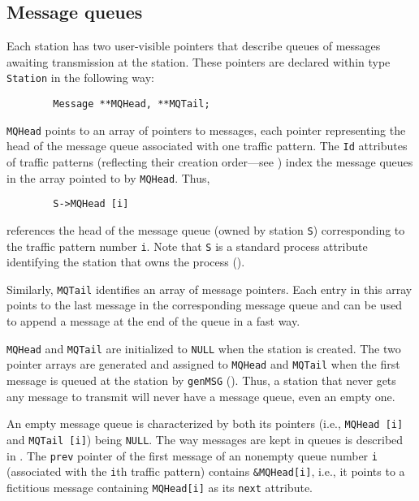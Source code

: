 \subsection{Message queues}
\label{rm_cl_mq}

Each station has two user-visible
pointers that describe queues of messages awaiting
transmission at the station.
These pointers are declared within type {\tt Station} in the following way:
\begin{verbatim}
        Message **MQHead, **MQTail;
\end{verbatim}

\noindent
{\tt MQHead} points to an array of pointers to messages, each pointer
representing the head of the message queue associated with one
traffic pattern.
The {\tt Id} attributes of traffic patterns (reflecting their creation
order---see ) index the message queues in the array
pointed to by {\tt MQHead}.
Thus,
\begin{verbatim}
        S->MQHead [i]
\end{verbatim}
references the head of the message queue (owned by station {\tt S})
corresponding to the traffic pattern number {\tt i}.
Note that {\tt S} is a standard process attribute identifying the station
that owns the process ().

Similarly, {\tt MQTail} identifies an array of message pointers.
Each entry
in this array points to the last message in the corresponding message queue
and can be used to append a message at the end of the queue in a fast way.

{\tt MQHead} and {\tt MQTail} are initialized to {\tt NULL} when the station
is created.
The two pointer arrays are generated and assigned to {\tt MQHead} and
{\tt MQTail} when
the first message is queued at the station by {\tt genMSG}
().
Thus, a station that never gets any message to transmit will never
have a message queue, even an empty one.

An empty message queue is characterized by both its pointers (i.e.,
{\tt MQHead~[i]} and {\tt MQTail~[i]}) being {\tt NULL}.
The way messages are kept in queues is described in .
The {\tt prev} pointer of the first message of an nonempty queue number
{\tt i} (associated with the {\tt i}th traffic pattern) contains
{\tt \&MQHead[i]}, i.e., it points to a fictitious message containing
{\tt MQHead[i]} as its {\tt next} attribute.

